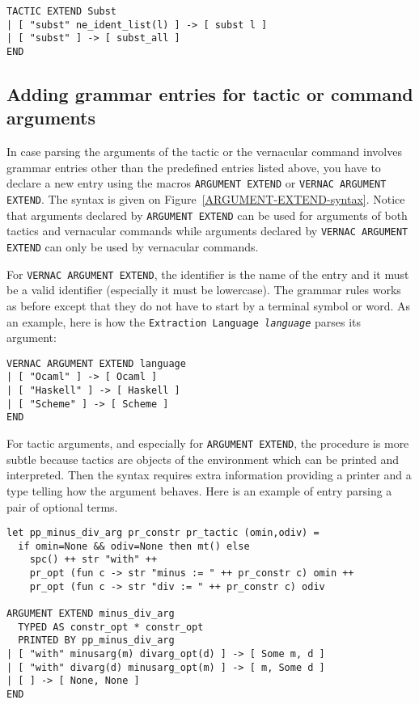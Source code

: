 \begin{verbatim}
TACTIC EXTEND Subst
| [ "subst" ne_ident_list(l) ] -> [ subst l ]
| [ "subst" ] -> [ subst_all ]
END
\end{verbatim}

\subsection{Adding grammar entries for tactic or command arguments}

In case parsing the arguments of the tactic or the vernacular command
involves grammar entries other than the predefined entries listed
above, you have to declare a new entry using the macros
\verb=ARGUMENT EXTEND= or \verb=VERNAC ARGUMENT EXTEND=. The syntax is
given on Figure~\ref{ARGUMENT-EXTEND-syntax}. Notice that arguments
declared by \verb=ARGUMENT EXTEND= can be used for arguments of both
tactics and vernacular commands while arguments declared by
\verb=VERNAC ARGUMENT EXTEND= can only be used by vernacular commands.

For \verb=VERNAC ARGUMENT EXTEND=, the identifier is the name of the
entry and it must be a valid {\ocaml} identifier (especially it must
be lowercase).  The grammar rules works as before except that they do
not have to start by a terminal symbol or word.  As an example, here
is how the {\Coq} {\tt Extraction Language {\it language}} parses its
argument:

\begin{verbatim}
VERNAC ARGUMENT EXTEND language
| [ "Ocaml" ] -> [ Ocaml ]
| [ "Haskell" ] -> [ Haskell ]
| [ "Scheme" ] -> [ Scheme ]
END
\end{verbatim}

For tactic arguments, and especially for \verb=ARGUMENT EXTEND=, the
procedure is more subtle because tactics are objects of the {\Coq}
environment which can be printed and interpreted. Then the syntax
requires extra information providing a printer and a type telling how
the argument behaves. Here is an example of entry parsing a pair of
optional {\Coq} terms.

\begin{verbatim}
let pp_minus_div_arg pr_constr pr_tactic (omin,odiv) = 
  if omin=None && odiv=None then mt() else
    spc() ++ str "with" ++
    pr_opt (fun c -> str "minus := " ++ pr_constr c) omin ++
    pr_opt (fun c -> str "div := " ++ pr_constr c) odiv

ARGUMENT EXTEND minus_div_arg 
  TYPED AS constr_opt * constr_opt
  PRINTED BY pp_minus_div_arg
| [ "with" minusarg(m) divarg_opt(d) ] -> [ Some m, d ]
| [ "with" divarg(d) minusarg_opt(m) ] -> [ m, Some d ]
| [ ] -> [ None, None ]
END
\end{verbatim}

